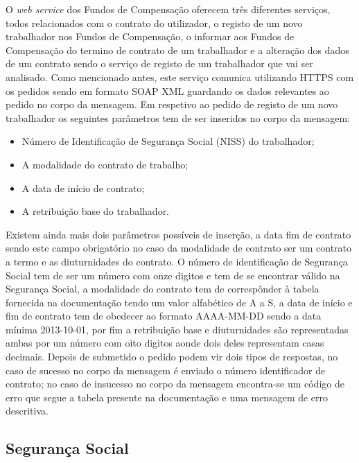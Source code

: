 \documentclass[sigplan]{acmart}
\begin{document}
O \textit{web service} dos Fundos de Compensação oferecem três diferentes serviços, todos relacionados com o contrato do utilizador, o registo de um novo trabalhador nos Fundos de Compensação, o informar aos Fundos de Compensação do termino de contrato de um trabalhador e a alteração dos dados de um contrato sendo o serviço de registo de um trabalhador que vai ser analisado. Como mencionado antes, este serviço comunica utilizando HTTPS com os pedidos sendo em formato SOAP XML guardando os dados relevantes ao pedido no corpo da mensagem. Em respetivo ao pedido de registo de um novo trabalhador os seguintes parâmetros tem de ser inseridos no corpo da mensagem:
\begin{itemize}
  \item Número de Identificação de Segurança Social (NISS) do trabalhador;
  \item A modalidade do contrato de trabalho;
  \item A data de início de contrato;
  \item A retribuição base do trabalhador.
\end{itemize}
Existem ainda mais dois parâmetros possíveis de inserção, a data fim de contrato sendo este campo obrigatório no caso da modalidade de contrato ser um contrato a termo e as diuturnidades do contrato. O número de identificação de Segurança Social tem de ser um número com onze digitos e tem de se encontrar válido na Segurança Social, a modalidade do contrato tem de correspônder à tabela fornecida na documentação tendo um valor alfabético de A a S, a data de início e fim de contrato tem de obedecer ao formato AAAA-MM-DD sendo a data mínima 2013-10-01, por fim a retribuição base e diuturnidades são representadas ambas por um número com oito digitos aonde dois deles representam casas decimais. Depois de submetido o pedido podem vir dois tipos de respostas, no caso de sucesso no corpo da mensagem é enviado o número identificador de contrato; no caso de insucesso no corpo da mensagem encontra-se um código de erro que segue a tabela presente na documentação e uma mensagem de erro descritiva.

\subsection{Segurança Social}
\end{document}
